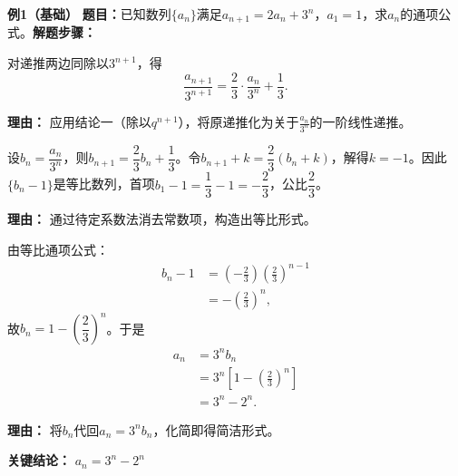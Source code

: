 \begin{examplebox}
	\textbf{\textcolor{CExample}{例1（基础）}}
	\textbf{\textcolor{CExample}{题目：}}已知数列$\{a_n\}$满足$a_{n+1}=2a_n+3^n$，$a_1=1$，求$a_n$的通项公式。\textbf{\textcolor{CExample}{解题步骤：}}
	\begin{description}[style=nextline, leftmargin=2.8em, labelsep=0.5em, itemsep=0.45em]
		\item[\textbf{第一步（同除构造）：}]
			对递推两边同除以$3^{n+1}$，得
			\[
				\frac{a_{n+1}}{3^{n+1}} = \frac{2}{3}\cdot\frac{a_n}{3^n} + \frac{1}{3}.
			\]
			\par\textbf{理由：} 应用结论一（除以$q^{n+1}$），将原递推化为关于$\frac{a_n}{3^n}$的一阶线性递推。
		\item[\textbf{第二步（构造等比）：}]
			设$b_n=\dfrac{a_n}{3^n}$，则$b_{n+1}=\dfrac{2}{3}b_n+\dfrac{1}{3}$。令$b_{n+1}+k=\dfrac{2}{3}(b_n+k)$，解得$k=-1$。因此$\{b_n-1\}$是等比数列，首项$b_1-1=\dfrac{1}{3}-1=-\dfrac{2}{3}$，公比$\dfrac{2}{3}$。
			\par\textbf{理由：} 通过待定系数法消去常数项，构造出等比形式。
		\item[\textbf{第三步（回代得解）：}]
			由等比通项公式：
			\[
				\begin{aligned}
					b_n-1 &= \left(-\frac{2}{3}\right)\left(\frac{2}{3}\right)^{n-1} \\ &= -\left(\frac{2}{3}\right)^n,
			\end{aligned}
			\]
			故$b_n=1-\left(\dfrac{2}{3}\right)^n$。于是
			\[
				\begin{aligned}
					a_n &= 3^n b_n \\ &= 3^n\left[1-\left(\frac{2}{3}\right)^n\right] \\ &= 3^n-2^n.
			\end{aligned}
			\]
			\par\textbf{理由：} 将$b_n$代回$a_n=3^n b_n$，化简即得简洁形式。
	\end{description}
	\textbf{\textcolor{CExample}{关键结论：}}
	\textbf{$a_n = 3^n - 2^n$}


\end{examplebox}
